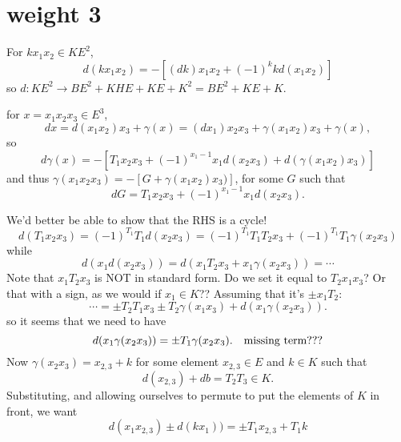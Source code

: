 \documentclass[11pt]{amsart}
\def\g{{\gamma}}
\begin{document}
\section{weight 3}
For $kx_1x_2\in KE^2$,
$$
d(kx_1x_2) = -[(dk)x_1x_2 + (-1)^k kd(x_1x_2)]
$$
so $d: KE^2 \to BE^2+KHE+KE+K^2 = BE^2+KE+K.$

for $x = x_1x_2x_3\in E^3$,
$$
dx = d(x_1x_2)x_3+\g(x) = (dx_1)x_2x_3+\g(x_1x_2)x_3+\g(x),
$$
so
$$
d\g(x) = -[T_1x_2x_3 + (-1)^{x_1-1}x_1d(x_2x_3) + d(\g(x_1x_2)x_3)]
$$
and thus $\g(x_1x_2x_3) = -[G+\g(x_1x_2)x_3)]$, for some $G$ such that
$$
dG = T_1x_2x_3 + (-1)^{x_1-1}x_1d(x_2x_3).
$$

We'd better be able to show that the RHS is a cycle!
$$
d(T_1x_2x_3) = (-1)^{T_1}T_1d(x_2x_3)=  (-1)^{T_1}T_1T_2x_3+ (-1)^{T_1}T_1\g(x_2x_3)
$$
while 
$$
d(x_1d(x_2x_3)) = d(x_1T_2x_3+x_1\g(x_2x_3)) = \cdots
$$
Note that $x_1T_2x_3$ is NOT in standard form. Do we set it equal to $T_2x_1x_3$? Or that with a sign, as we would if $x_1\in K$??
Assuming that it's $\pm x_1T_2$: 
$$
\cdots = \pm T_2T_1x_3\pm T_2\g(x_1x_3)+d(x_1\gamma(x_2x_3)). 
$$
so it seems that we need to have
$$
d(x_1\gamma(x_2x_3)) = \pm T_1\g(x_2x_3). \quad \hbox{missing term???}
$$
Now $\g(x_2x_3) = x_{2,3}+k$ for some element $x_{2,3}\in E$ and $k\in K$ such that 
$$
d(x_{2,3})+db = T_2T_3\in K.
$$
Substituting, and allowing ourselves to permute to put the elements of $K$ in front, we want
$$
d(x_1x_{2,3})\pm d(kx_1))= \pm T_1x_{2,3}+T_1k
$$
\end{document}
